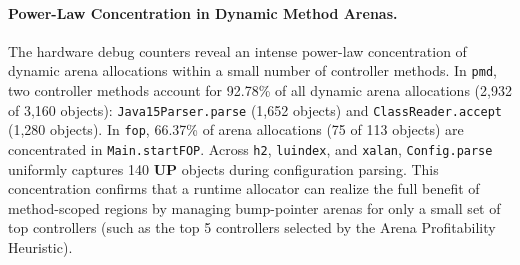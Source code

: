 \documentclass[12pt,a4paper]{article}
\newcommand{\UP}{\textbf{UP}}
\begin{document}
\paragraph{Power-Law Concentration in Dynamic Method Arenas.}
The hardware debug counters reveal an intense power-law concentration of dynamic arena allocations within a small number of controller methods. In \texttt{pmd}, two controller methods account for 92.78\% of all dynamic arena allocations (2{,}932 of 3{,}160 objects): \texttt{Java15Parser.parse} (1{,}652 objects) and \texttt{ClassReader.accept} (1{,}280 objects). In \texttt{fop}, 66.37\% of arena allocations (75 of 113 objects) are concentrated in \texttt{Main.startFOP}. Across \texttt{h2}, \texttt{luindex}, and \texttt{xalan}, \texttt{Config.parse} uniformly captures 140 \UP{} objects during configuration parsing. This concentration confirms that a runtime allocator can realize the full benefit of method-scoped regions by managing bump-pointer arenas for only a small set of top controllers (such as the top 5 controllers selected by the Arena Profitability Heuristic).

\end{document}
